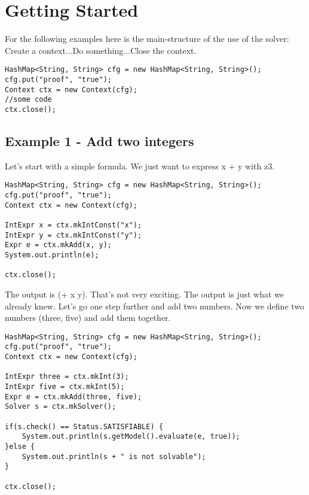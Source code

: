 



\chapter{Getting Started}

For the following examples here is the main-structure of the use of the solver: Create a context...Do something...Close the context.\\
\begin{lstlisting}[frame=single]
HashMap<String, String> cfg = new HashMap<String, String>();
cfg.put("proof", "true");
Context ctx = new Context(cfg);
//some code
ctx.close();
\end{lstlisting}


\section{Example 1 - Add two integers}
Let's start with a simple formula. We just want to express x + y with z3.
\begin{lstlisting}[frame=single]
HashMap<String, String> cfg = new HashMap<String, String>();
cfg.put("proof", "true");
Context ctx = new Context(cfg);

IntExpr x = ctx.mkIntConst("x");
IntExpr y = ctx.mkIntConst("y");
Expr e = ctx.mkAdd(x, y);
System.out.println(e);

ctx.close();
\end{lstlisting}

The output is (+ x y). 
That's not very exciting. 
The output is just what we already knew. Let's go one step further and add two numbers.
Now we define two numbers (three, five) and add them together.

\begin{lstlisting}[frame=single]
HashMap<String, String> cfg = new HashMap<String, String>();
cfg.put("proof", "true");
Context ctx = new Context(cfg);

IntExpr three = ctx.mkInt(3);
IntExpr five = ctx.mkInt(5);
Expr e = ctx.mkAdd(three, five);
Solver s = ctx.mkSolver();
		
if(s.check() == Status.SATISFIABLE) {
	System.out.println(s.getModel().evaluate(e, true));
}else {
	System.out.println(s + " is not solvable");
}

ctx.close();
\end{lstlisting}

